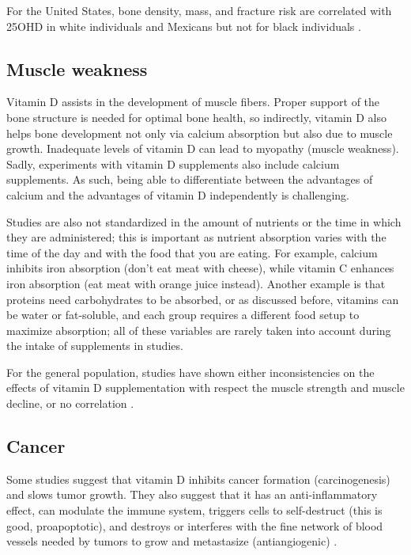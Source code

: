 For the United States, bone density, mass, and fracture risk are correlated with 25OHD in white individuals and Mexicans but not for black individuals \cite{ref:Brown2018, ref:Aloia2019, ref:Aloia2005}.


\subsection{Muscle weakness}

Vitamin D assists in the development of muscle fibers. Proper support of the bone structure is needed for optimal bone health, so indirectly, vitamin D also helps bone development not only via calcium absorption but also due to muscle growth. Inadequate levels of vitamin D can lead to myopathy (muscle weakness). Sadly, experiments with vitamin D supplements also include calcium supplements. As such, being able to differentiate between the advantages of calcium and the advantages of vitamin D independently is challenging.

Studies are also not standardized in the amount of nutrients or the time in which they are administered; this is important as nutrient absorption varies with the time of the day and with the food that you are eating. For example, calcium inhibits iron absorption (don't eat meat with cheese), while vitamin C enhances iron absorption \cite{ref:Li2020, ref:Lynch1980, ref:Li2020}(eat meat with orange juice instead). Another example is that proteins need carbohydrates to be absorbed, or as discussed before, vitamins can be water or fat-soluble, and each group requires a different food setup to maximize absorption; all of these variables are rarely taken into account during the intake of supplements in studies.

For the general population, studies have shown either inconsistencies \cite{ref:screeningErin2014} on the effects of vitamin D supplementation with respect the muscle strength and muscle decline, or no correlation \cite{ref:Shea2019,ref:Vaes2018}.


\subsection{Cancer}

Some studies suggest that vitamin D inhibits cancer formation (carcinogenesis) and slows tumor growth. They also suggest that it has an anti-inflammatory effect, can modulate the immune system, triggers cells to self-destruct (this is good, proapoptotic), and  destroys or interferes with the fine network of blood vessels needed by tumors to grow and metastasize (antiangiogenic) \cite{ref:Manson2017, ref:1_Institute_of_Medicine2011-zg}.

